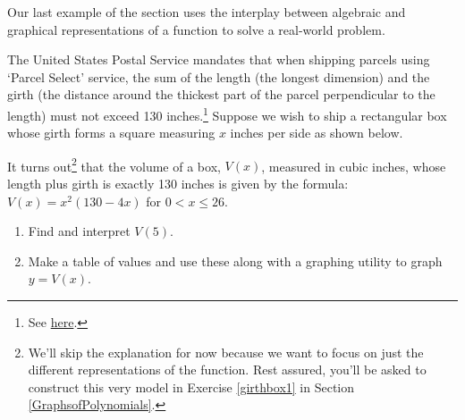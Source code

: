 \documentclass{ximera}
\begin{document}
Our last example of the section uses the interplay between algebraic and graphical representations of a function to solve a real-world problem.

\begin{example} \label{volumeex1}    The United States Postal Service mandates that when shipping parcels using `Parcel Select' service,  the sum of the length (the longest dimension) and the girth (the distance around the thickest part of the parcel perpendicular to the length) must not exceed 130 inches.\footnote{See \href{http://pe.usps.com/text/qsg300/Q201e.htm}{{here}}.}  Suppose we wish to ship a rectangular box whose girth forms a square measuring $x$ inches per side as shown below.

\begin{image}
\end{image}
\begin{center}
\end{center}


It turns out\footnote{We'll skip the explanation for now because we want to focus on just the different representations of the function. Rest assured, you'll be asked to construct this very model in Exercise \ref{girthbox1} in Section \ref{GraphsofPolynomials}.} that the volume of a box, $V(x)$, measured in cubic inches,  whose length plus girth is exactly 130 inches is given by the formula: $V(x) = x^2 (130-4x)$ for $0 < x \leq 26$.

 

\begin{enumerate}

\item  Find and interpret $V(5)$.

\item  Make a table of values and use these along with a graphing utility to graph $y = V(x)$.


\end{enumerate}
\end{example}
\end{document}
